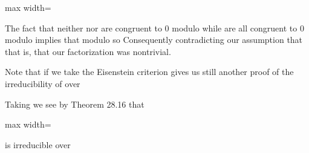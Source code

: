 \documentclass[11pt,oneside]{article}
\begin{document}
\begin{BookBody}
\begin{center}\begin{adjustbox}{max width=\linewidth}\end{adjustbox}\end{center}

\noindent The fact that neither  nor  are congruent to 0 modulo  while  are all congruent to 0 modulo  implies that  modulo  so  Consequently contradicting our assumption that  that is, that our factorization was nontrivial. \BookEnd{\blacklozenge}

Note that if we take  the Eisenstein criterion gives us still another proof of the irreducibility of  over 

 Taking  we see by Theorem 28.16 that

\begin{center}\begin{adjustbox}{max width=\linewidth}\end{adjustbox}\end{center}

\noindent is irreducible over  \BookEnd{\blacktriangle}

\end{BookBody}

\BookNarrativetrue
\end{document}
